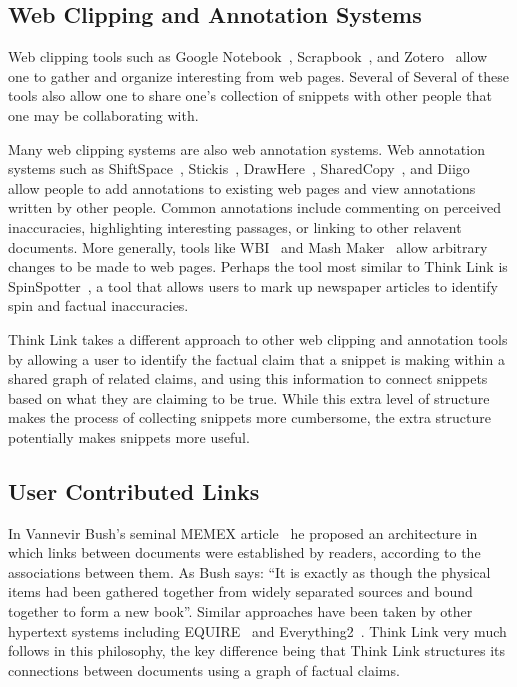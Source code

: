 \documentclass{chi2009}
\begin{document}
\subsection{Web Clipping and Annotation Systems}

Web clipping tools such as Google Notebook~\cite{googlenotebook}, Scrapbook~\cite{scrapbook}, and Zotero~\cite{zotero} allow one to gather and organize interesting from web pages. Several of Several of these tools also allow one to share one's collection of snippets with other people that one may be collaborating with. 

Many web clipping systems are also web annotation systems. Web annotation systems such as ShiftSpace~\cite{shiftspace}, Stickis~\cite{stickis}, DrawHere~\cite{drawhere}, SharedCopy~\cite{sharedcopy}, and Diigo~\cite{diigo} allow people to add annotations to existing web pages and view annotations written by other people. Common annotations include commenting on perceived inaccuracies, highlighting interesting passages, or linking to other relavent documents. More generally, tools like WBI~\cite{personalweb} and Mash Maker~\cite{mashmaker} allow arbitrary changes to be made to web pages. Perhaps the tool most similar to Think Link is SpinSpotter~\cite{spinspotter}, a tool that allows users to mark up newspaper articles to identify spin and factual inaccuracies.

Think Link takes a different approach to other web clipping and annotation tools by allowing a user to identify the factual claim that a snippet is making within a shared graph of related claims, and using this information to connect snippets based on what they are claiming to be true. While this extra level of structure makes the process of collecting snippets more cumbersome, the extra structure potentially makes snippets more useful.


\subsection{User Contributed Links}

In Vannevir Bush's seminal MEMEX article~\cite{memex} he proposed an architecture in which links between documents were established by readers, according to the associations between them. As Bush says: ``It is exactly as though the physical items had been gathered together from widely separated sources and bound together to form a new book''. Similar approaches have been taken by other hypertext systems including EQUIRE~\cite{enquire} and Everything2~\cite{everything2}. Think Link very much follows in this philosophy, the key difference being that Think Link structures its connections between documents using a graph of factual claims.
\end{document}
